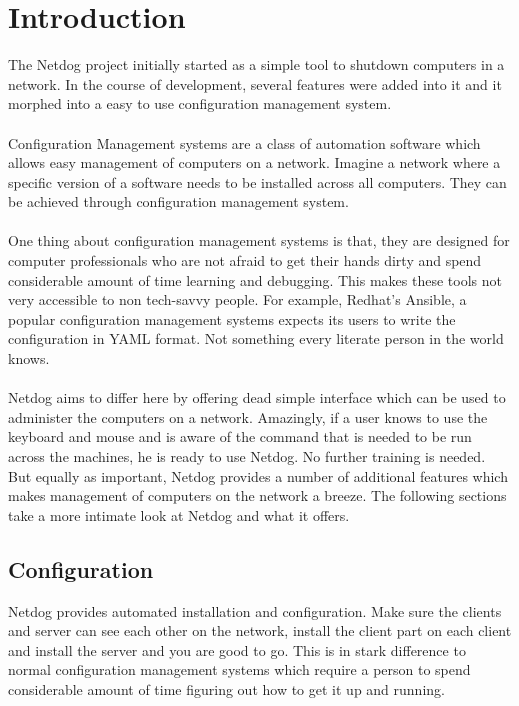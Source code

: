 \chapter{Introduction}

The Netdog project initially started as a simple tool to shutdown computers in a
network. In the course of development, several features were added into it and
it morphed into a easy to use configuration management system.
\\\\
Configuration Management systems are a class of automation software which allows
easy management of computers on a network. Imagine a network where a specific
version of a software needs to be installed across all computers. They can be
achieved through configuration management system.
\\\\
One thing about configuration management systems is that, they are designed for
computer professionals who are not afraid to get their hands dirty and spend
considerable amount of time learning and debugging. This makes these tools not
very accessible to non tech-savvy people. For example, Redhat's Ansible, a
popular configuration management systems expects its users to write the
configuration in YAML format. Not something every literate person in the world
knows.
\\\\
Netdog aims to differ here by offering dead simple interface which can be used
to administer the computers on a network. Amazingly, if a user knows to use the
keyboard and mouse and is aware of the command that is needed to be run across
the machines, he is ready to use Netdog. No further training is needed. But
equally as important, Netdog provides a number of additional features which
makes management of computers on the network a breeze. The following sections
take a more intimate look at Netdog and what it offers.

\section{Configuration}
Netdog provides automated installation and configuration. Make sure the clients
and server can see each other on the network, install the client part on each
client and install the server and you are good to go. This is in stark
difference to normal configuration management systems which require a person to
spend considerable amount of time figuring out how to get it up and running.

